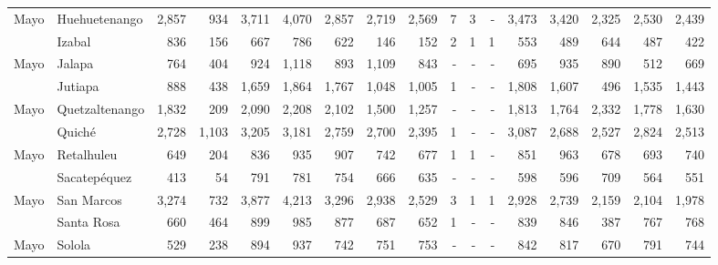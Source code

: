 \begin{landscape}
\begin{center}
\begin{longtable}{llrrrrrrrrrrrrrrr}
			\multicolumn{1}{l}{	\footnotesize	 Mayo 	}&	 Huehuetenango 	&	 2,857 	&	 934 	&	 3,711 	&	 4,070 	&	 2,857 	&	 2,719 	&	 2,569 	&	 7 	&	 3 	&	 -   	&	 3,473 	&	 3,420 	&	 2,325 	&	 2,530 	&	 2,439 	\\
			\rowcolor{color1!5!white}\multicolumn{1}{l}{	\footnotesize	 Mayo 	}&	 Izabal 	&	 836 	&	 156 	&	 667 	&	 786 	&	 622 	&	 146 	&	 152 	&	 2 	&	 1 	&	 1 	&	 553 	&	 489 	&	 644 	&	 487 	&	 422 	\\
			\multicolumn{1}{l}{	\footnotesize	 Mayo 	}&	 Jalapa 	&	 764 	&	 404 	&	 924 	&	 1,118 	&	 893 	&	 1,109 	&	 843 	&	 -   	&	 -   	&	 -   	&	 695 	&	 935 	&	 890 	&	 512 	&	 669 	\\
			\rowcolor{color1!5!white}\multicolumn{1}{l}{	\footnotesize	 Mayo 	}&	 Jutiapa 	&	 888 	&	 438 	&	 1,659 	&	 1,864 	&	 1,767 	&	 1,048 	&	 1,005 	&	 1 	&	 -   	&	 -   	&	 1,808 	&	 1,607 	&	 496 	&	 1,535 	&	 1,443 	\\
			\multicolumn{1}{l}{	\footnotesize	 Mayo 	}&	 Quetzaltenango 	&	 1,832 	&	 209 	&	 2,090 	&	 2,208 	&	 2,102 	&	 1,500 	&	 1,257 	&	 -   	&	 -   	&	 -   	&	 1,813 	&	 1,764 	&	 2,332 	&	 1,778 	&	 1,630 	\\
			\rowcolor{color1!5!white}\multicolumn{1}{l}{	\footnotesize	 Mayo 	}&	 Quiché 	&	 2,728 	&	 1,103 	&	 3,205 	&	 3,181 	&	 2,759 	&	 2,700 	&	 2,395 	&	 1 	&	 -   	&	 -   	&	 3,087 	&	 2,688 	&	 2,527 	&	 2,824 	&	 2,513 	\\
			\multicolumn{1}{l}{	\footnotesize	 Mayo 	}&	 Retalhuleu 	&	 649 	&	 204 	&	 836 	&	 935 	&	 907 	&	 742 	&	 677 	&	 1 	&	 1 	&	 -   	&	 851 	&	 963 	&	 678 	&	 693 	&	 740 	\\
			\rowcolor{color1!5!white}\multicolumn{1}{l}{	\footnotesize	 Mayo 	}&	 Sacatepéquez 	&	 413 	&	 54 	&	 791 	&	 781 	&	 754 	&	 666 	&	 635 	&	 -   	&	 -   	&	 -   	&	 598 	&	 596 	&	 709 	&	 564 	&	 551 	\\
			\multicolumn{1}{l}{	\footnotesize	 Mayo 	}&	 San Marcos 	&	 3,274 	&	 732 	&	 3,877 	&	 4,213 	&	 3,296 	&	 2,938 	&	 2,529 	&	 3 	&	 1 	&	 1 	&	 2,928 	&	 2,739 	&	 2,159 	&	 2,104 	&	 1,978 	\\
			\rowcolor{color1!5!white}\multicolumn{1}{l}{	\footnotesize	 Mayo 	}&	 Santa Rosa 	&	 660 	&	 464 	&	 899 	&	 985 	&	 877 	&	 687 	&	 652 	&	 1 	&	 -   	&	 -   	&	 839 	&	 846 	&	 387 	&	 767 	&	 768 	\\
			\multicolumn{1}{l}{	\footnotesize	 Mayo 	}&	 Solola 	&	 529 	&	 238 	&	 894 	&	 937 	&	 742 	&	 751 	&	 753 	&	 -   	&	 -   	&	 -   	&	 842 	&	 817 	&	 670 	&	 791 	&	 744 	\\

\end{longtable}
\end{center}
\end{landscape}
